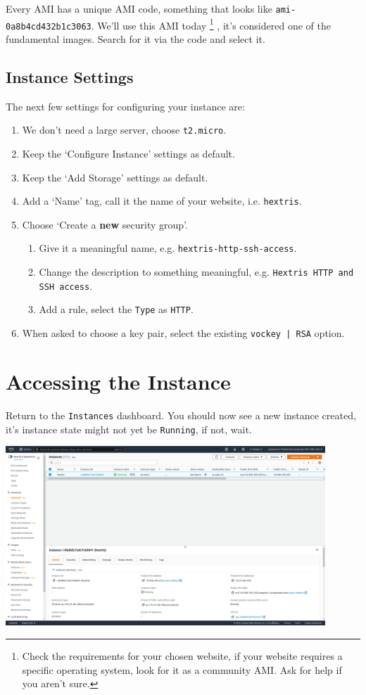 \documentclass{csse4400}
\begin{document}
Every AMI has a unique AMI code, something that looks like \texttt{ami-0a8b4cd432b1c3063}.
We'll use this AMI today%
\footnote{Check the requirements for your chosen website, if your website requires a specific operating system, look for it as a community AMI.
Ask for help if you aren't sure.}
, it's considered one of the fundamental images.
Search for it via the code and select it.

\subsection{Instance Settings}
The next few settings for configuring your instance are:
\begin{enumerate}
\item We don't need a large server, choose \texttt{t2.micro}.
\item Keep the `Configure Instance' settings as default.
\item Keep the `Add Storage' settings as default.
\item Add a `Name' tag, call it the name of your website, i.e. \texttt{hextris}.
\item Choose `Create a \textbf{new} security group'.
\begin{enumerate}
\item Give it a meaningful name, e.g. \texttt{hextris-http-ssh-access}.
\item Change the description to something meaningful, e.g. \texttt{Hextris HTTP and SSH access}.
\item Add a rule, select the \texttt{Type} as \texttt{HTTP}.
\end{enumerate}
\item When asked to choose a key pair, select the existing \texttt{vockey | RSA} option.
\end{enumerate}

\section{Accessing the Instance}

Return to the \texttt{Instances} dashboard.
You should now see a new instance created, it's instance state might not yet be \texttt{Running}, if not, wait.

\includegraphics[width=0.9\textwidth]{images/instance-interface}
\end{document}
